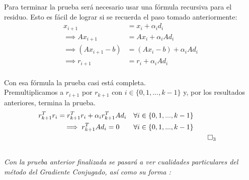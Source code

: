 \documentclass[12pt]{article}
\newcommand{\beas}{\begin{eqnarray*}}
\newcommand{\eeas}{\end{eqnarray*}}
\begin{document}
Para terminar la prueba ser\'a necesario usar una f\'ormula recursiva para el residuo. Esto es f\'acil de lograr si se recuerda el paso tomado anteriormente: 
\begin{align*}
    x_{i+1} &= x_i + \alpha_i d_i \\
    \implies A x_{i+1} &=  Ax_i + \alpha_i A d_i \\
\implies ( Ax_{i+1} - b) &= (Ax_i - b) + \alpha_i Ad_i \\
\implies r_{i+1} &= r_i +  \alpha_i  Ad_i \\
\end{align*}
	
Con esa f\'ormula la prueba casi est\'a completa. \\
Premultiplicamos a $r_{i+1}$ por $r_{k+1}$ con $i \in \{0,1, ...,k-1\}$ y, por los resultados anteriores, termina la prueba. 
\beas
r_{k+1}^Tr_{i} = r_{k+1}^Tr_i + \alpha_ir_{k+1}^TAd_i \quad \forall i \in \{0,1, ... ,k-1 \} \\
\implies r_{k+1}^TAd_i = 0 \quad \quad \forall i \in \{0, 1, ..., k-1\}\\ \quad &\qed_3 
\eeas \\

{\it Con la prueba anterior finalizada se pasar\'a a ver cualidades particulares del m\'etodo del Gradiente Conjugado, as\'i como su forma :}
\end{document}
